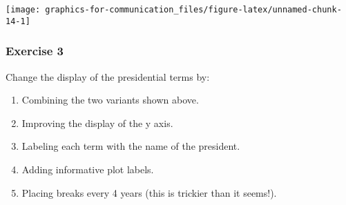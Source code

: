\documentclass[]{book}
\providecommand{\tightlist}{%
  \setlength{\itemsep}{0pt}\setlength{\parskip}{0pt}}
\theoremstyle{plain}
\theoremstyle{remark}
\theoremstyle{definition}
\theoremstyle{definition}
\theoremstyle{definition}
\theoremstyle{remark}
\begin{document}
\begin{center}\texttt{[image: graphics-for-communication\_files/figure-latex/unnamed-chunk-14-1]} \end{center}

\hypertarget{exercise-3-60}{%
\subsubsection{Exercise 3}\label{exercise-3-60}}

Change the display of the presidential terms by:

\begin{enumerate}
\def\labelenumi{\arabic{enumi}.}
\tightlist
\item
  Combining the two variants shown above.
\item
  Improving the display of the y axis.
\item
  Labeling each term with the name of the president.
\item
  Adding informative plot labels.
\item
  Placing breaks every 4 years (this is trickier than it seems!).
\end{enumerate}
\end{document}
